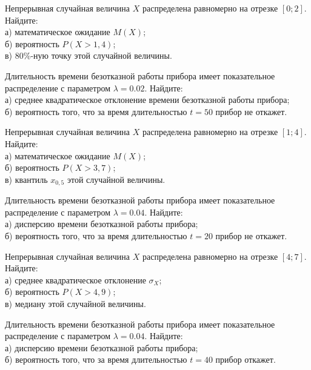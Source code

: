 \vfill

\newpage\setcounter{zad}{0}

\z Непрерывная случайная величина $X$ распределена равномерно на отрезке $[0; 2]$. Найдите: \\ \quad а) математическое ожидание $M(X)$; \\ \quad б) вероятность $P(X>1{,}4)$; \\ \quad в) $80\%$-ную точку этой случайной величины.


\vfill

\z Длительность времени безотказной работы прибора имеет показательное распределение с параметром $\lambda = 0.02$. Найдите: \\ \quad а) среднее квадратическое отклонение времени безотказной работы прибора; \\ \quad б) вероятность того, что за время длительностью $t = 50$ прибор не откажет.
 

\vfill

\newpage\setcounter{zad}{0}

\z Непрерывная случайная величина $X$ распределена равномерно на отрезке $[1; 4]$. Найдите: \\ \quad а) математическое ожидание $M(X)$; \\ \quad б) вероятность $P(X>3{,}7)$; \\ \quad в) квантиль $x_{0{,}5}$ этой случайной величины.


\vfill

\z Длительность времени безотказной работы прибора имеет показательное распределение с параметром $\lambda = 0.04$. Найдите: \\ \quad а) дисперсию времени безотказной работы прибора; \\ \quad б) вероятность того, что за время длительностью $t = 20$ прибор не откажет.
 

\vfill

\newpage\setcounter{zad}{0}

\z Непрерывная случайная величина $X$ распределена равномерно на отрезке $[4; 7]$. Найдите: \\ \quad а) среднее квадратическое отклонение $\sigma_X$; \\ \quad б) вероятность $P(X>4{,}9)$; \\ \quad в) медиану этой случайной величины.


\vfill

\z Длительность времени безотказной работы прибора имеет показательное распределение с параметром $\lambda = 0.04$. Найдите: \\ \quad а) дисперсию времени безотказной работы прибора; \\ \quad б) вероятность того, что за время длительностью $t = 40$ прибор  откажет.
 

